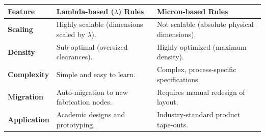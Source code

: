 \documentclass[12pt,a4paper]{article}
\renewcommand{\arraystretch}{1.45}
\begin{document}
\begin{tcolorbox}[tikzbox, title={Lambda ($\lambda$) rules vs. Micron rules}]
\renewcommand{\arraystretch}{1.4}
\par\noindent
\begin{tabularx}{\linewidth}{|B{3.2cm}|Y|Y|}
\hline
\textbf{Feature} & \textbf{\color{myred}Lambda-based ($\lambda$) Rules} & \textbf{\color{myteal}Micron-based Rules} \\
\hline
\textbf{Scaling} & Highly scalable (dimensions scaled by $\lambda$). & Not scalable (absolute physical dimensions). \\
\hline
\textbf{Density} & Sub-optimal (oversized clearances). & Highly optimized (maximum density). \\
\hline
\textbf{Complexity} & Simple and easy to learn. & Complex, process-specific specifications. \\
\hline
\textbf{Migration} & Auto-migration to new fabrication nodes. & Requires manual redesign of layout. \\
\hline
\textbf{Application} & Academic designs and prototyping. & Industry-standard product tape-outs. \\
\hline
\end{tabularx}
\end{tcolorbox}
\end{document}
